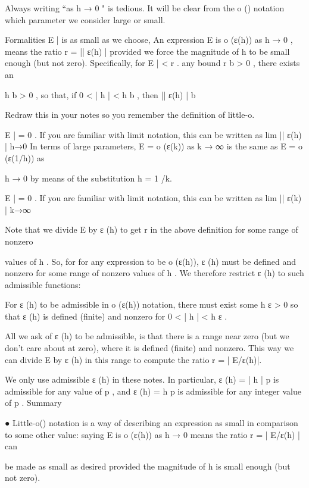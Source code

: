 Always writing “as  h → 0 "  is tedious.  It will be clear from the  o ()  notation which parameter we  
consider large or small. 
 
Formalities
E | is as small as we choose,  
An expression  E    is  o (ε(h))  as  h → 0 , means the ratio  r = || ε(h)
|
provided we force the magnitude of  h to be small enough (but not zero).  Specifically, for  
E | < r .  
any bound   r b > 0 ,  there exists an 
 
h b > 0 ,  so that, if  0 < | h | < h b ,  then  || ε(h)
| b
 
 
 
 
Redraw this in your notes so you remember the definition of little-o. 
 
 
E | = 0 .  
If you are familiar with limit notation, this can be written as  lim || ε(h)
|
h→0
 In terms of large parameters,  E = o (ε(k))    as  k → ∞   is the same as  E = o (ε(1/h))  as
   
h → 0 by means of the substitution  h = 1 /k.  
 
E | = 0 .  
If you are familiar with limit notation, this can be written as  lim || ε(k)
|
k→∞
 
Note that we divide  E  by 
  ε (h)  to get  r  in the above definition for some range of nonzero
 
 
values of  h .    So, for for any expression to be  o (ε(h)),   ε (h)  must be defined and nonzero  
for some range of nonzero values of  h .    We therefore restrict  ε (h)  to such admissible  
functions:   
 
For  ε (h)  to be admissible in  o (ε(h))  notation, there must exist some  h ε > 0  so  
that  ε (h)  is defined (finite) and nonzero for  0 < | h | < h ε .     
 
 
All we ask of  ε (h)  to be admissible, is that there is a range near zero (but we don’t  
care about at zero), where it is defined (finite) and nonzero.  This way we can 
divide  E    by  ε (h)  in this range to compute the ratio  r = | E/ε(h)|.  
 
 We only use admissible   ε (h)  in these notes.  In particular,  ε (h) = | h | p  is admissible for  
any value of  p ,  and   ε (h) = h p  is admissible for any integer value of  p .  
Summary
 
●
Little-o() notation is a way of describing an expression as small in comparison to 
some other value: saying  E  is 
  o (ε(h))  as  h → 0  means the ratio  r = | E/ε(h) |  can
 
 be made as small as desired provided the magnitude of  h is small enough (but  
not zero). 
 

